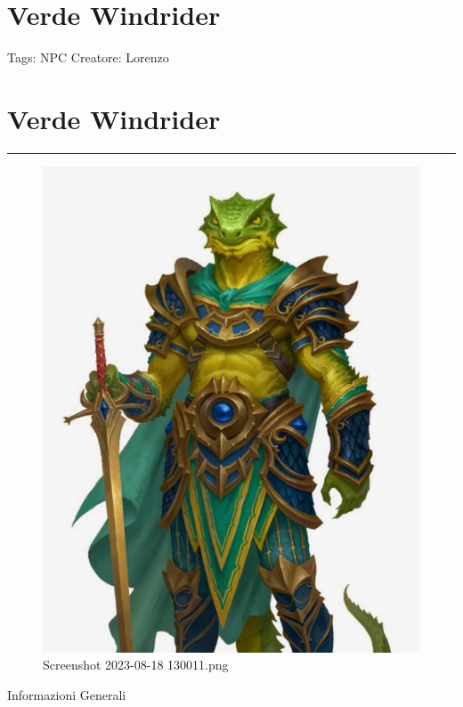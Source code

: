 \section{Verde Windrider}\label{verde-windrider}

Tags: NPC Creatore: Lorenzo

\section{Verde Windrider}\label{verde-windrider-1}

\begin{center}\rule{0.5\linewidth}{0.5pt}\end{center}

\begin{figure}
\centering
\includegraphics{Screenshot_2023-08-18_130011.png}
\caption{Screenshot 2023-08-18 130011.png}
\end{figure}

Informazioni Generali

